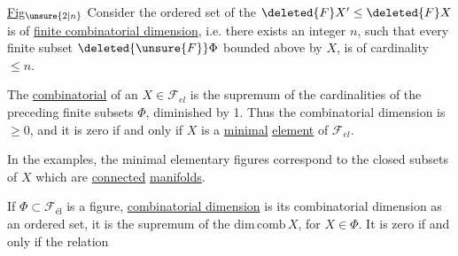 
\uline{Fig}$_{\unsure{2|n}}$  Consider the ordered set of the $\deleted{F}X'\leq\deleted{F}X$ is of \uline{finite combinatorial dimension}, i.e. there exists an integer $n$, such that every finite subset $\deleted{\unsure{F}}\Phi$  bounded above by $X$,  is of cardinality $\leq n$.

The \uline{combinatorial} \uline{} of an $X\in\mathcal{F}_{el}$ is the supremum of the cardinalities of the preceding finite subsets $\Phi$, diminished by 1. Thus the combinatorial dimension is $\geq 0$, and it is zero if and only if $X$ is a \uline{minimal} \uline{element} of $\mathcal{F}_{el}$.

In the  examples,  the minimal elementary figures correspond to the closed subsets of $X$ which are \uline{connected} \uline{manifolds}.

If $\Phi\subset\mathcal{F}_{\text{él}}$ is a figure,  \uline{combinatorial dimension} is its combinatorial dimension as an ordered set, it is  the supremum of the $\mathrm{dim\,comb}\,X$, for $X\in\Phi$. It is zero if and only if   the relation
